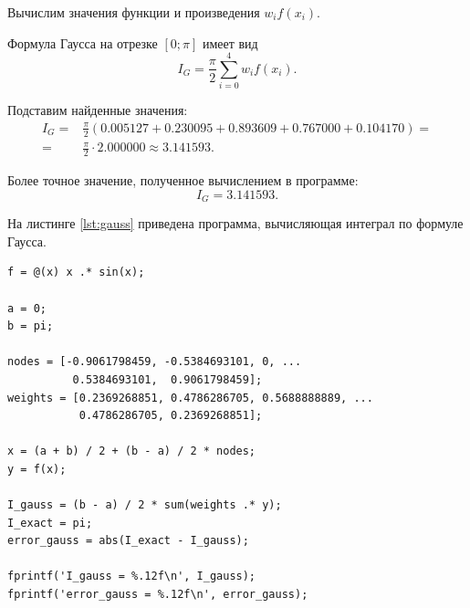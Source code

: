 Вычислим значения функции и произведения $w_if(x_i)$.

\begin{table}[H]
    \centering
    \caption{Вычисление слагаемых формулы Гаусса}
    \label{table:gauss_calc}
\end{table}

Формула Гаусса на отрезке $[0;\pi]$ имеет вид
\[
I_G=\frac{\pi}{2}\sum_{i=0}^{4}w_if(x_i).
\]

Подставим найденные значения:
\[
\begin{aligned}
I_G={}&\frac{\pi}{2}(0.005127+0.230095+0.893609+0.767000+0.104170)=\\
={}&\frac{\pi}{2}\cdot2.000000\approx3.141593.
\end{aligned}
\]

Более точное значение, полученное вычислением в программе:
\[
I_G=3.141593.
\]

На листинге \ref{lst:gauss} приведена программа, вычисляющая интеграл по формуле Гаусса.

\begin{listing}[H]
\caption{Вычисление интеграла по формуле Гаусса}
\vspace{-20pt}
\label{lst:gauss}
\begin{verbatim}
f = @(x) x .* sin(x);

a = 0;
b = pi;

nodes = [-0.9061798459, -0.5384693101, 0, ...
          0.5384693101,  0.9061798459];
weights = [0.2369268851, 0.4786286705, 0.5688888889, ...
           0.4786286705, 0.2369268851];

x = (a + b) / 2 + (b - a) / 2 * nodes;
y = f(x);

I_gauss = (b - a) / 2 * sum(weights .* y);
I_exact = pi;
error_gauss = abs(I_exact - I_gauss);

fprintf('I_gauss = %.12f\n', I_gauss);
fprintf('error_gauss = %.12f\n', error_gauss);
\end{verbatim}
\end{listing}

